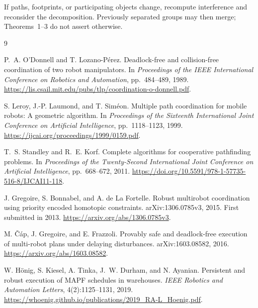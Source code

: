 \documentclass[11pt,a4paper]{article}
\theoremstyle{remark}
\begin{document}
If paths, footprints, or participating objects change, recompute interference
and reconsider the decomposition. Previously separated groups may then merge;
Theorems~1--3 do not assert otherwise.

\begin{thebibliography}{9}

P.~A. O'Donnell and T. Lozano-P\'erez.
\newblock Deadlock-free and collision-free coordination of two robot manipulators.
\newblock In \emph{Proceedings of the IEEE International Conference on Robotics
and Automation}, pp.~484--489, 1989.
\newblock \url{https://lis.csail.mit.edu/pubs/tlp/coordination-o-donnell.pdf}.

S. Leroy, J.-P. Laumond, and T. Sim\'eon.
\newblock Multiple path coordination for mobile robots: A geometric algorithm.
\newblock In \emph{Proceedings of the Sixteenth International Joint Conference
on Artificial Intelligence}, pp.~1118--1123, 1999.
\newblock \url{https://ijcai.org/proceedings/1999/0159.pdf}.

T.~S. Standley and R.~E. Korf.
\newblock Complete algorithms for cooperative pathfinding problems.
\newblock In \emph{Proceedings of the Twenty-Second International Joint
Conference on Artificial Intelligence}, pp.~668--672, 2011.
\newblock \url{https://doi.org/10.5591/978-1-57735-516-8/IJCAI11-118}.

J. Gregoire, S. Bonnabel, and A. de La Fortelle.
\newblock Robust multirobot coordination using priority encoded homotopic constraints.
\newblock arXiv:1306.0785v3, 2015. First submitted in 2013.
\newblock \url{https://arxiv.org/abs/1306.0785v3}.

M. \v{C}\'ap, J. Gregoire, and E. Frazzoli.
\newblock Provably safe and deadlock-free execution of multi-robot plans under
delaying disturbances.
\newblock arXiv:1603.08582, 2016.
\newblock \url{https://arxiv.org/abs/1603.08582}.

W. H\"onig, S. Kiesel, A. Tinka, J.~W. Durham, and N. Ayanian.
\newblock Persistent and robust execution of MAPF schedules in warehouses.
\newblock \emph{IEEE Robotics and Automation Letters}, 4(2):1125--1131, 2019.
\newblock \url{https://whoenig.github.io/publications/2019_RA-L_Hoenig.pdf}.

\end{thebibliography}
\end{document}

